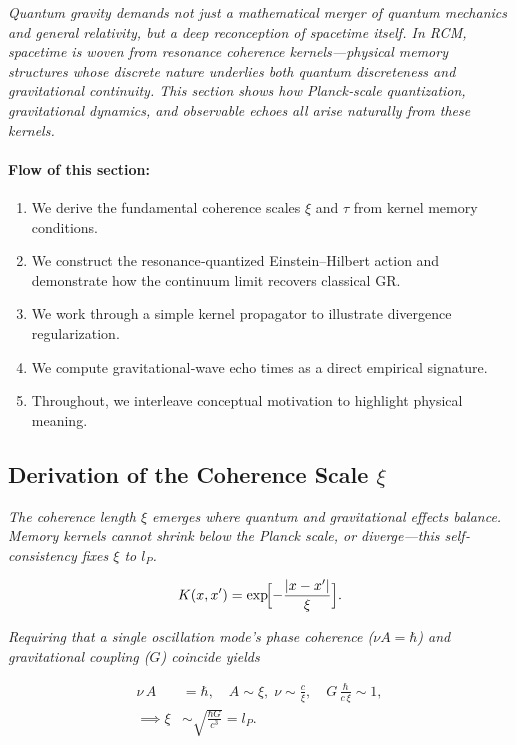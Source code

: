 \textit{Quantum gravity demands not just a mathematical merger of quantum mechanics and general relativity, but a deep reconception of spacetime itself.  In RCM, spacetime is woven from resonance coherence kernels—physical memory structures whose discrete nature underlies both quantum discreteness and gravitational continuity.  This section shows how Planck‐scale quantization, gravitational dynamics, and observable echoes all arise naturally from these kernels.}

\paragraph{Flow of this section:}
\begin{enumerate}
  \item We derive the fundamental coherence scales $\xi$ and $\tau$ from kernel memory conditions.
  \item We construct the resonance‐quantized Einstein–Hilbert action and demonstrate how the continuum limit recovers classical GR.
  \item We work through a simple kernel propagator to illustrate divergence regularization.
  \item We compute gravitational‐wave echo times as a direct empirical signature.
  \item Throughout, we interleave conceptual motivation to highlight physical meaning.
\end{enumerate}

\subsection{Derivation of the Coherence Scale \texorpdfstring{$\xi$}{ξ}}

\textit{The coherence length $\xi$ emerges where quantum and gravitational effects balance.  Memory kernels cannot shrink below the Planck scale, or diverge—this self‐consistency fixes $\xi$ to $l_P$.}

\begin{equation}\label{eq:kernel_basic}
K(x,x') = \exp\!\Bigl[-\frac{|x - x'|}{\xi}\Bigr].
\end{equation}

\textit{Requiring that a single oscillation mode’s phase coherence ($\nu A=\hbar$) and gravitational coupling ($G$) coincide yields}

\begin{align}
\nu\,A &= \hbar,\quad A\sim\xi,\;\nu\sim \frac{c}{\xi},
\quad
G\,\frac{\hbar}{c\,\xi} \sim 1,
\nonumber\\
\implies \xi &\sim \sqrt{\frac{\hbar G}{c^3}} = l_P.
\label{eq:xi_planck}
\end{align}

